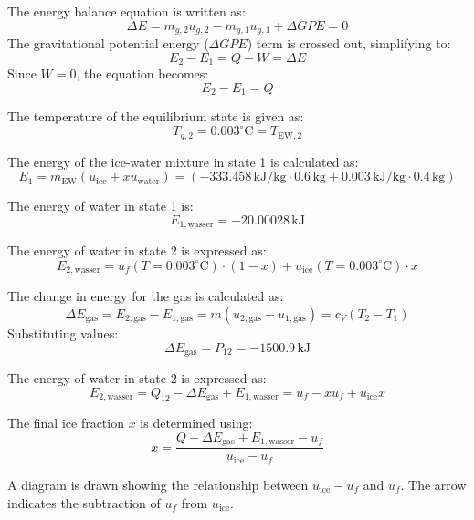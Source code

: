 The energy balance equation is written as:  
\[
\Delta E = m_{g,2} u_{g,2} - m_{g,1} u_{g,1} + \Delta GPE = 0
\]  
The gravitational potential energy (\( \Delta GPE \)) term is crossed out, simplifying to:  
\[
E_2 - E_1 = Q - W = \Delta E
\]  
Since \( W = 0 \), the equation becomes:  
\[
E_2 - E_1 = Q
\]  

The temperature of the equilibrium state is given as:  
\[
T_{g,2} = 0.003^\circ \text{C} = T_{\text{EW},2}
\]  

The energy of the ice-water mixture in state 1 is calculated as:  
\[
E_1 = m_{\text{EW}} (u_{\text{ice}} + x u_{\text{water}}) = (-333.458 \, \text{kJ/kg} \cdot 0.6 \, \text{kg} + 0.003 \, \text{kJ/kg} \cdot 0.4 \, \text{kg})
\]  

The energy of water in state 1 is:  
\[
E_{1,\text{wasser}} = -20.00028 \, \text{kJ}
\]  

The energy of water in state 2 is expressed as:  
\[
E_{2,\text{wasser}} = u_f(T = 0.003^\circ \text{C}) \cdot (1 - x) + u_{\text{ice}}(T = 0.003^\circ \text{C}) \cdot x
\]  

The change in energy for the gas is calculated as:  
\[
\Delta E_{\text{gas}} = E_{2,\text{gas}} - E_{1,\text{gas}} = m (u_{2,\text{gas}} - u_{1,\text{gas}}) = c_V (T_2 - T_1)
\]  
Substituting values:  
\[
\Delta E_{\text{gas}} = P_{12} = -1500.9 \, \text{kJ}
\]  

The energy of water in state 2 is expressed as:  
\[
E_{2,\text{wasser}} = Q_{12} - \Delta E_{\text{gas}} + E_{1,\text{wasser}} = u_f - x u_f + u_{\text{ice}} x
\]  

The final ice fraction \( x \) is determined using:  
\[
x = \frac{Q - \Delta E_{\text{gas}} + E_{1,\text{wasser}} - u_f}{u_{\text{ice}} - u_f}
\]  

A diagram is drawn showing the relationship between \( u_{\text{ice}} - u_f \) and \( u_f \). The arrow indicates the subtraction of \( u_f \) from \( u_{\text{ice}} \).